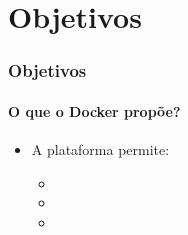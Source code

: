\section{Objetivos}

\begin{frame}
\frametitle{Objetivos}
\framesubtitle{O que o Docker propõe?}
\begin{itemize}
	\item A plataforma permite:
	\begin{itemize}
		\item {}
		\item {}
		\item {}
	\end{itemize}
\end{itemize}
\end{frame}


